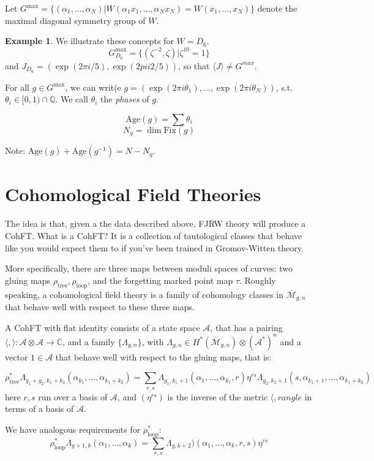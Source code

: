 \documentclass{amsart}
\theoremstyle{definition}
\newtheorem{example}[dummy]{Example}
\newcommand{\Mbar}{\overline{\mathcal{M}}}
\newcommand{\Q}{\mathbb{Q}}
\newcommand{\C}{\mathbb{C}}
\newcommand{\Age}{\text{Age}}
\newcommand{\Fix}{\text{Fix}}
\newcommand{\one}{1}
\begin{document}
Let $G^{\max}=\{(\alpha_1,\dots,\alpha_N)|W(\alpha_1x_1,\dots,\alpha_Nx_N)=W(x_1,\dots, x_N)\}$ denote the maximal diagonal symmetry group of $W$.

\begin{example}
We illustrate these concepts for $W=D_6$.
$$G^{\max}_{D_6}=\{(\zeta^{-2},\zeta)|\zeta^10=1\}$$
and $J_{D_6}=(\exp(2\pi i /5),\exp(2pi i 2/5))$,
so that $\langle J\rangle \neq G^{max}$.
\end{example}

For all $g\in G^{\max}$, we can writ(e $g=(\exp(2\pi i\theta_1),\dots,\exp(2\pi i\theta_N))$, s.t. $\theta_i\in[0,1)\cap \Q$.  We call $\theta_i$ the \emph{phases} of $g$.  

$$\Age(g)=\sum\theta_i$$
$$N_g=\dim \Fix(g)$$

Note: $\Age(g)+\Age(g^{-1})=N-N_g$.

\section{Cohomological Field Theories}
The idea is that, given a the data described above, FJRW theory will produce a CohFT.  What is a CohFT?  It is a collection of tautological classes that behave like you would expect them to if you've been trained in Gromov-Witten theory.

More specifically, there are three maps between moduli spaces of curves: two gluing maps $\rho_{\text{tree}},\rho_{\text{loop}}$, and the forgetting marked point map $\tau$.  
Roughly speaking, a cohomological field theory is a family of cohomology classes in $\Mbar_{g,n}$ that behave well with respect to these three maps.


A CohFT with flat identity consists of a state space $\mathcal{A}$, that has a pairing $\langle,\rangle:\mathcal{A}\otimes\mathcal{A}\to\C$, and a family
$\{\Lambda_{g,n}\}$, with $\Lambda_{g,n}\in H^*(\Mbar_{g,n})\otimes (\mathcal{A}^*)^n$
and a vector $\one\in\mathcal{A}$ that behave well with respect to the gluing maps, that is:

$$\rho^*_{\text{tree}}\Lambda_{g_1+g_2, k_1+k_2}(\alpha_{k_1},\dots,\alpha_{k_1+k_2})
=\sum_{r,s} \Lambda_{g_1, k_1+1}(\alpha_1,\dots,\alpha_{k_1},r)\eta^{rs}\Lambda_{g_2, k_2+1}(s,\alpha_{k_1+1},\dots,\alpha_{k_1+k_2})$$
here $r,s$ run over a basis of $\mathcal{A}$, and $(\eta^{rs})$ is the inverse of the metric $\langle, rangle$ in terms of a basis of $\mathcal{A}$.

We have analogous requirements for $\rho^*_{\text{loop}}$:
$$\rho^*_{\text{loop}}\Lambda_{g+1,k}(\alpha_1,\dots,\alpha_k)=\sum_{r,s}\Lambda_{g,k+2})(\alpha_1,\dots,\alpha_k,r,s)\eta^{rs}$$
\end{document}
